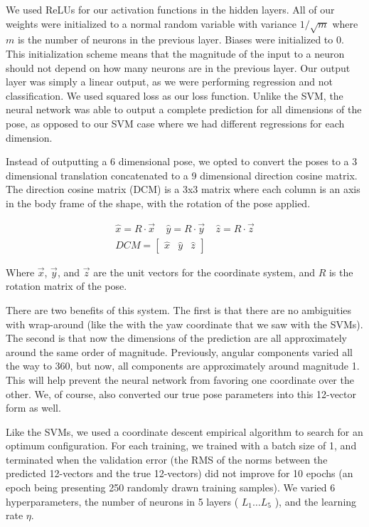 \documentclass[journal]{IEEEtran}
\begin{document}
We used ReLUs for our activation functions in the hidden layers. All of our weights were initialized to a normal random variable with variance $1/\sqrt{m}$ where $m$ is the number of neurons in the previous layer. Biases were initialized to 0. This initialization scheme means that the magnitude of the input to a neuron should not depend on how many neurons are in the previous layer. Our output layer was simply a linear output, as we were performing regression and not classification. We used squared loss as our loss function. Unlike the SVM, the neural network was able to output a complete prediction for all dimensions of the pose, as opposed to our SVM case where we had different regressions for each dimension.

Instead of outputting a 6 dimensional pose, we opted to convert the poses to a 3 dimensional translation concatenated to a 9 dimensional direction cosine matrix. The direction cosine matrix (DCM) is a 3x3 matrix where each column is an axis in the body frame of the shape, with the rotation of the pose applied.

\begin{gather}
\nonumber \hat x = R \cdot \vec x \; \; \; \; \hat y = R \cdot \vec y \; \; \; \; \hat z = R \cdot \vec z\\
DCM =
\begin{bmatrix}
\hat x & \hat y & \hat z
\end{bmatrix}
\end{gather} 

\noindent Where $\vec x$, $\vec y$, and $\vec z$ are the unit vectors for the coordinate system, and $R$ is the rotation matrix of the pose.

There are two benefits of this system. The first is that there are no ambiguities with wrap-around (like the with the yaw coordinate that we saw with the SVMs). The second is that now the dimensions of the prediction are all approximately around the same order of magnitude. Previously, angular components varied all the way to 360, but now, all components are approximately around magnitude 1. This will help prevent the neural network from favoring one coordinate over the other. We, of course, also converted our true pose parameters into this 12-vector form as well.

Like the SVMs, we used a coordinate descent empirical algorithm to search for an optimum configuration. For each training, we trained with a batch size of 1, and terminated when the validation error (the RMS of the norms between the predicted 12-vectors and the true 12-vectors) did not improve for 10 epochs (an epoch being presenting 250 randomly drawn training samples). We varied 6 hyperparameters, the number of neurons in 5 layers ( $L_1 \dots L_5$ ), and the learning rate $\eta$.
\end{document}
